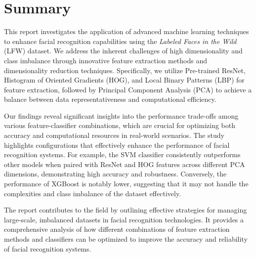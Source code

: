 \documentclass[a4paper]{article}
\theoremstyle{plain}
\theoremstyle{definition}
\begin{document}
\section{Summary}

This report investigates the application of advanced machine learning techniques to enhance facial recognition capabilities using the \textit{Labeled Faces in the Wild} (LFW) dataset. We address the inherent challenges of high dimensionality and class imbalance through innovative feature extraction methods and dimensionality reduction techniques. Specifically, we utilize Pre-trained ResNet, Histogram of Oriented Gradients (HOG), and Local Binary Patterns (LBP) for feature extraction, followed by Principal Component Analysis (PCA) to achieve a balance between data representativeness and computational efficiency.

Our findings reveal significant insights into the performance trade-offs among various feature-classifier combinations, which are crucial for optimizing both accuracy and computational resources in real-world scenarios. The study highlights configurations that effectively enhance the performance of facial recognition systems. For example, the SVM classifier consistently outperforms other models when paired with ResNet and HOG features across different PCA dimensions, demonstrating high accuracy and robustness. Conversely, the performance of XGBoost is notably lower, suggesting that it may not handle the complexities and class imbalance of the dataset effectively.

The report contributes to the field by outlining effective strategies for managing large-scale, imbalanced datasets in facial recognition technologies. It provides a comprehensive analysis of how different combinations of feature extraction methods and classifiers can be optimized to improve the accuracy and reliability of facial recognition systems.

	



	
	
	\appendix
	
\end{document}
